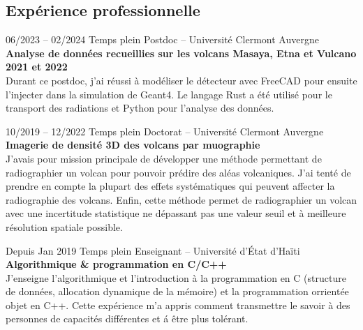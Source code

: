 \documentclass[
	10pt, %
]{FreemanCV}
\begin{document}
\begin{paracol}{2}

\section{Expérience professionnelle}




\jobentry
	{06/2023 -- 02/2024} %
	{Temps plein} %
	{Postdoc -- Université Clermont Auvergne} %
	{}
	{\textbf{Analyse de données recueillies sur les volcans Masaya, Etna et Vulcano 2021 et 2022}}\\
	{
		Durant ce postdoc, j'ai r\'eussi \`a mod\'eliser le d\'etecteur avec FreeCAD pour ensuite l'injecter dans la simulation de Geant4. Le langage Rust a \'et\'e utilis\'e pour le transport des radiations et Python pour l'analyse des donn\'ees.
	}
\medskip %
\medskip %


\jobentry
	{10/2019 -- 12/2022} %
	{Temps plein} %
	{Doctorat -- Université Clermont Auvergne} %
	{}
	{\textbf{Imagerie de densité 3D des volcans par muographie}}\\
	{
		J'avais pour mission principale de d\'evelopper une m\'ethode permettant de radiographier un volcan pour pouvoir pr\'edire des al\'eas volcaniques. J'ai tent\'e de prendre en compte la plupart des effets syst\'ematiques qui peuvent affecter la radiographie des volcans. Enfin, cette m\'ethode permet de radiographier un volcan avec une incertitude statistique ne d\'epassant pas une valeur seuil et \`a meilleure r\'esolution spatiale possible.
	}
\medskip %
\medskip %


\jobentry
	{Depuis Jan 2019} %
	{Temps plein} %
	{Enseignant -- Université d’État d’Haïti} %
	{}
	{\textbf{Algorithmique \& programmation en C/C++}}\\
	{
		J'enseigne l'algorithmique et l'introduction \`a la programmation en C (structure de donn\'ees, allocation dynamique de la m\'emoire) et la programmation orrient\'ee objet en C++. Cette exp\'erience m'a appris comment transmettre le savoir \`a des personnes de capacit\'es diff\'erentes et \'a \^etre plus tol\'erant.
	}
\medskip %
\medskip %


\end{paracol}
\end{document}
